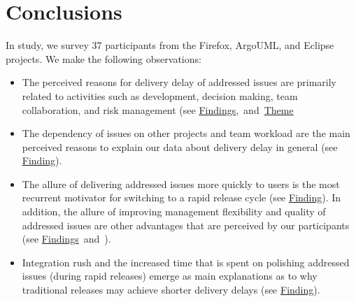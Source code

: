 \section{Conclusions} \label{ch6:conclusion}

In \DIFdelbegin {}\DIFdelend \DIFaddbegin {}\DIFaddend study, we survey 37 participants from the Firefox, ArgoUML,
and Eclipse projects. We make the following observations:

\begin{itemize}

      \item  The perceived reasons for delivery delay of addressed issues
      	are primarily related to activities such as development, decision making, team
      	collaboration, and risk management (see
      	\DIFdelbegin %
\DIFdel{~\ref{th:1},~\ref{th:2},~\ref{th:3}}\DIFdelend \DIFaddbegin \hyperref[find25]{Findings}\DIFadd{~\ref{find25},~\ref{find26},~\ref{find27}}\DIFaddend ,~and~\DIFdelbegin {}\DIFdelend \DIFaddbegin {}\hyperref[th:4]{Theme}\DIFaddend 

      \item  The dependency of issues on other projects and team workload are
	      the main perceived reasons to explain our data about delivery
	      delay in general (see \DIFdelbegin %
\DIFdel{~\ref{th:1}}\DIFdelend \DIFaddbegin \hyperref[find34]{Finding}\DIFadd{~\ref{find34}}\DIFaddend ).  

      \item  The allure of delivering addressed issues more quickly to users is
	      the most recurrent motivator for switching to a rapid release
	      cycle (see \DIFdelbegin %
\DIFdel{~\ref{th:7}}\DIFdelend \DIFaddbegin \hyperref[find32]{Finding}\DIFadd{~\ref{find32}}\DIFaddend ). In addition, the
	      allure of improving management flexibility and quality of
	      addressed issues are other advantages that are perceived by our
	      participants (see
	      \DIFdelbegin %
\DIFdel{~\ref{th:6}}\DIFdelend \DIFaddbegin \hyperref[find31]{Findings}\DIFadd{~\ref{find31}}\DIFaddend ~and~\DIFdelbegin \DIFdel{\ref{th:8}}\DIFdelend \DIFaddbegin \DIFadd{\ref{find33}}\DIFaddend ).

      \item Integration rush and the increased time that is spent on polishing
	      addressed issues (during rapid releases) emerge as \DIFdelbegin {}\DIFdelend main
	      explanations as to why traditional releases may achieve shorter
	      delivery delays (see \DIFdelbegin %
\DIFdel{~\ref{th:10}}\DIFdelend \DIFaddbegin \hyperref[find35]{Finding}\DIFadd{~\ref{find35}}\DIFaddend ).

\end{itemize}

